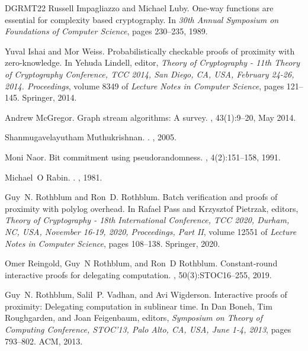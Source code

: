 \documentclass[10pt,a4paper]{article}
\theoremstyle{definition}
\begin{document}
\begin{thebibliography}{DGRMT22}
Russell Impagliazzo and Michael Luby.
\newblock One-way functions are essential for complexity based cryptography.
\newblock In {\em 30th Annual Symposium on Foundations of Computer Science}, pages 230--235, 1989.

Yuval Ishai and Mor Weiss.
\newblock Probabilistically checkable proofs of proximity with zero-knowledge.
\newblock In Yehuda Lindell, editor, {\em Theory of Cryptography - 11th Theory of Cryptography Conference, {{TCC}} 2014, San Diego, {{CA}}, {{USA}}, February 24-26, 2014. {{Proceedings}}}, volume 8349 of {\em Lecture Notes in Computer Science}, pages 121--145. {Springer}, 2014.

Andrew McGregor.
\newblock Graph stream algorithms: {{A}} survey.
, 43(1):9--20, May 2014.

Shanmugavelayutham Muthukrishnan.
.
, 2005.

Moni Naor.
\newblock Bit commitment using pseudorandomness.
, 4(2):151--158, 1991.

Michael~O Rabin.
.
, 1981.

Guy~N. Rothblum and Ron~D. Rothblum.
\newblock Batch verification and proofs of proximity with polylog overhead.
\newblock In Rafael Pass and Krzysztof Pietrzak, editors, {\em Theory of {{Cryptography}} - 18th {{International Conference}}, {{TCC}} 2020, {{Durham}}, {{NC}}, {{USA}}, {{November}} 16-19, 2020, {{Proceedings}}, {{Part II}}}, volume 12551 of {\em Lecture {{Notes}} in {{Computer Science}}}, pages 108--138. {Springer}, 2020.

Omer Reingold, Guy~N Rothblum, and Ron~D Rothblum.
\newblock Constant-round interactive proofs for delegating computation.
, 50(3):STOC16--255, 2019.

Guy~N. Rothblum, Salil~P. Vadhan, and Avi Wigderson.
\newblock Interactive proofs of proximity: Delegating computation in sublinear time.
\newblock In Dan Boneh, Tim Roughgarden, and Joan Feigenbaum, editors, {\em Symposium on {{Theory}} of {{Computing Conference}}, {{STOC}}'13, {{Palo Alto}}, {{CA}}, {{USA}}, {{June}} 1-4, 2013}, pages 793--802. {ACM}, 2013.


\end{thebibliography}
\end{document}
